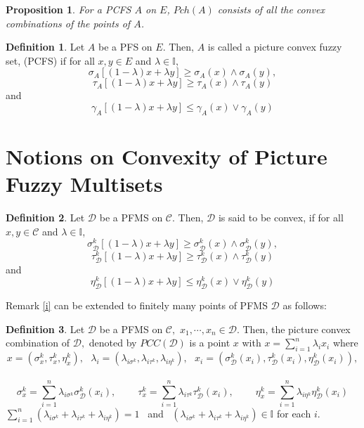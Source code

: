 \documentclass[12pt,letterpaper]{amsart}
\theoremstyle{plain}
\newtheorem{proposition}{Proposition}[section]
\theoremstyle{definition}
\newtheorem{definition}{Definition}[section]
\numberwithin{equation}{section}
\begin{document}
\begin{proposition} \cite{s1}
For a PCFS $A$ on $E$, $Pch(A)$ consists of all the convex combinations of the points of $A$.
\end{proposition}

\begin{definition}\cite{s1} 
Let $A$ be a PFS on $E$. Then, $A$ is called a picture convex fuzzy set, (PCFS) if for all $x, y \in E$ and $\lambda \in \mathbb{I}$,
$$ \sigma_{A} [(1 - \lambda)x + \lambda y] \geq \sigma_{A}(x) \wedge \sigma_{A}(y),$$ $$\tau_{A} [(1 - \lambda)x + \lambda y] \geq \tau_{A}(x) \wedge \tau_{A}(y)$$ and $$\gamma_{A}[(1 - \lambda)x + \lambda y] \leq \gamma_{A}(x) \vee \gamma_{A}(y)$$
\end{definition}

\section{Notions on Convexity of Picture Fuzzy Multisets}
\begin{definition} \label{f}
Let $\mathcal{D}$ be a PFMS on $\mathcal{C}$. Then, $\mathcal{D}$ is said to be convex, if for all $x, y \in \mathcal{C}$ and $\lambda \in \mathbb{I}$,
$$ \sigma^k_{\mathcal{D}} [(1 - \lambda)x + \lambda y] \geq \sigma^k_{\mathcal{D}}(x) \wedge \sigma^k_{\mathcal{D}}(y),$$ $$\tau^k_{\mathcal{D}} [(1 - \lambda)x + \lambda y] \geq \tau^k_{\mathcal{D}}(x) \wedge \tau^k_{\mathcal{D}}(y)$$ and $$\eta^k_{\mathcal{D}}[(1 - \lambda)x + \lambda y] \leq \eta^k_{\mathcal{D}}(x) \vee \eta^k_{\mathcal{D}}(y)$$
\end{definition}

\noindent Remark \ref{i} can be extended to finitely many points of PFMS $\mathcal{D}$ as follows:

\begin{definition}  \label{g}
Let $\mathcal{D}$ be a PFMS on $\mathcal{C},$ $x_1, \cdots, x_{n} \in \mathcal{D}$. Then, the picture convex combination of $\mathcal{D},$ denoted by $PCC(\mathcal{D})$ is a point $x$ with $x = \sum \limits_{i=1}^{n} \lambda_{i} x_i$ where $$x = (\sigma^k_x, \tau^k_x, \eta^k_x ),~~~ \lambda_i = (\lambda_{i \sigma^k}, \lambda_{i \tau^k}, \lambda_{i \eta^k} ),~~~ x_i = ( \sigma^k_{\mathcal{D}}(x_i), \tau^k_{\mathcal{D}}(x_i), \eta^k_{\mathcal{D}}(x_i) ),$$~~~ $$\sigma^k_x = \sum \limits_{i=1}^{n} \lambda_{i \sigma^k} \sigma^k_{\mathcal{D}}(x_i), ~~~~~~~~~~ \tau^k_x = \sum \limits_{i=1}^{n} \lambda_{i \tau^k} \tau^k_{\mathcal{D}}(x_i),~~~~~~~~~~ \eta^k_x = \sum \limits_{i=1}^{n} \lambda_{i \eta^k} \eta^k_{\mathcal{D}}(x_i)$$  $\sum \limits_{i=1}^{n} (\lambda_{i \sigma^k} + \lambda_{i \tau^k} + \lambda_{i \eta^k}) = 1$~ and~ $ (\lambda_{i \sigma^k} + \lambda_{i \tau^k} + \lambda_{i \eta^k}) \in \mathbb{I}$ for each $i$.
\end{definition}
\end{document}
